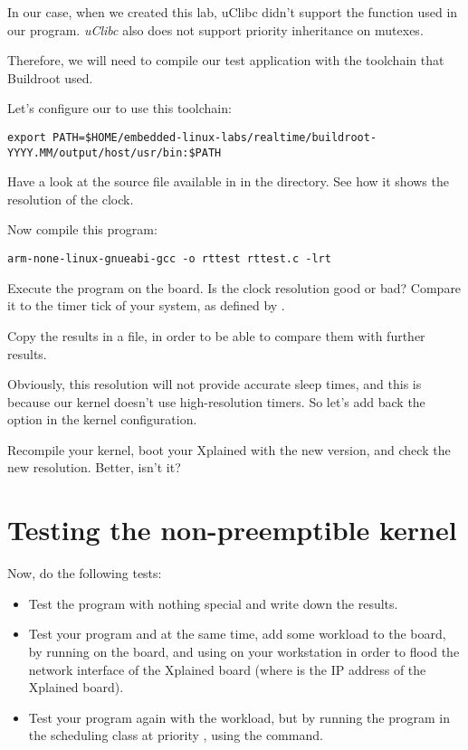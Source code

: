 In our case, when we created this lab, uClibc didn't support the
 function used in our 
program. {\em uClibc} also does not support priority inheritance on
mutexes.

Therefore, we will need to compile our test application with the
toolchain that Buildroot used.

Let's configure our  to use this toolchain:

\scriptsize
\begin{verbatim}
export PATH=$HOME/embedded-linux-labs/realtime/buildroot-YYYY.MM/output/host/usr/bin:$PATH
\end{verbatim}
\normalsize

Have a look at the  source file available in
 in the  directory. See how it shows the
resolution of the  clock.

Now compile this program:
\begin{verbatim}
arm-none-linux-gnueabi-gcc -o rttest rttest.c -lrt
\end{verbatim}

Execute the program on the board. Is the clock resolution good or bad?
Compare it to the timer tick of your system, as defined by
.

Copy the results in a file, in order to be able to compare them
with further results.

Obviously, this resolution will not provide accurate sleep times, and
this is because our kernel doesn't use high-resolution timers. So
let's add back the  option in the kernel
configuration.

Recompile your kernel, boot your Xplained with the new version, and
check the new resolution. Better, isn't it?

\section{Testing the non-preemptible kernel}

Now, do the following tests:
\begin{itemize}
\item Test the program with nothing special and write down the
  results.
\item Test your program and at the same time, add some workload to the
  board, by running  on the
  board, and using  on your
  workstation in order to flood the network interface of the Xplained
  board (where  is the IP address of the Xplained
  board).
\item Test your program again with the workload, but by running the
  program in the  scheduling class at priority
  , using the  command.
\end{itemize}

